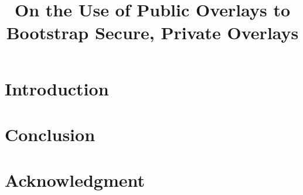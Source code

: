 \documentclass[conference]{IEEEtran}
\begin{document}
\title{On the Use of Public Overlays to Bootstrap Secure, Private Overlays}

\author{ 
}

\maketitle

\begin{abstract}
\end{abstract}

\section{Introduction}
\section{Conclusion}
\section*{Acknowledgment}


\small{

\suppressfloats
}
\end{document}
